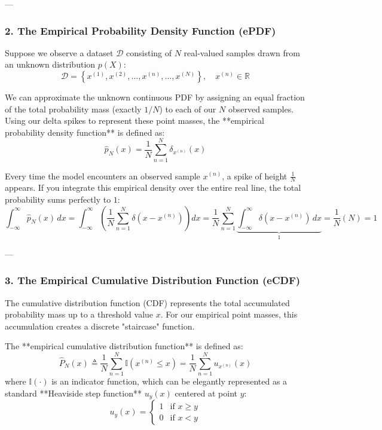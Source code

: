 \documentclass{article}
\begin{document}
---

\subsubsection*{2. The Empirical Probability Density Function (ePDF)}

Suppose we observe a dataset $\mathcal{D}$ consisting of $N$ real-valued samples drawn from an unknown distribution $p(X)$:
\begin{equation*}
\mathcal{D} = \left\{ x^{(1)}, x^{(2)}, \dots, x^{(n)}, \dots, x^{(N)} \right\}, \quad x^{(n)} \in \mathbb{R}
\end{equation*}

We can approximate the unknown continuous PDF by assigning an equal fraction of the total probability mass (exactly $1/N$) to each of our $N$ observed samples. Using our delta spikes to represent these point masses, the **empirical probability density function** is defined as:
\begin{equation}
\hat{p}_N(x) = \frac{1}{N} \sum_{n=1}^{N} \delta_{x^{(n)}}(x) \tag{208}
\end{equation}

Every time the model encounters an observed sample $x^{(n)}$, a spike of height $\frac{1}{N}$ appears. If you integrate this empirical density over the entire real line, the total probability sums perfectly to $1$:
\begin{equation*}
\int_{-\infty}^{\infty} \hat{p}_N(x) \, dx = \int_{-\infty}^{\infty} \left( \frac{1}{N} \sum_{n=1}^{N} \delta(x - x^{(n)}) \right) dx = \frac{1}{N} \sum_{n=1}^{N} \underbrace{\int_{-\infty}^{\infty} \delta(x - x^{(n)}) \, dx}_{1} = \frac{1}{N} (N) = 1
\end{equation*}

---

\subsubsection*{3. The Empirical Cumulative Distribution Function (eCDF)}

The cumulative distribution function (CDF) represents the total accumulated probability mass up to a threshold value $x$. For our empirical point masses, this accumulation creates a discrete "staircase" function.

The **empirical cumulative distribution function** is defined as:
\begin{equation}
\hat{P}_N(x) \triangleq \frac{1}{N} \sum_{n=1}^{N} \mathbb{I}\left( x^{(n)} \le x \right) = \frac{1}{N} \sum_{n=1}^{N} u_{x^{(n)}}(x) \tag{209}
\end{equation}
where $\mathbb{I}(\cdot)$ is an indicator function, which can be elegantly represented as a standard **Heaviside step function** $u_y(x)$ centered at point $y$:
\begin{equation}
u_y(x) = 
\begin{cases} 
1 & \text{if } x \ge y \\ 
0 & \text{if } x < y 
\end{cases} \tag{210}
\end{equation}
\end{document}
